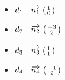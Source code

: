 \documentclass[12pt, a4paper]{article}
\begin{document}
    \begin{Exercise}[number={51}]
        \begin{itemize}
            \item $d_1 \quad \overrightarrow{n_1}\ \begin{psmallmatrix}1 \\ 0\end{psmallmatrix}$
            \item $d_2 \quad \overrightarrow{n_2}\ \begin{psmallmatrix}-3 \\ 2\end{psmallmatrix}$
            \item $d_3 \quad \overrightarrow{n_3}\ \begin{psmallmatrix}1 \\ 1\end{psmallmatrix}$
            \item $d_4 \quad \overrightarrow{n_4}\ \begin{psmallmatrix}-1 \\ 2\end{psmallmatrix}$
        \end{itemize}
    \end{Exercise}
\end{document}
